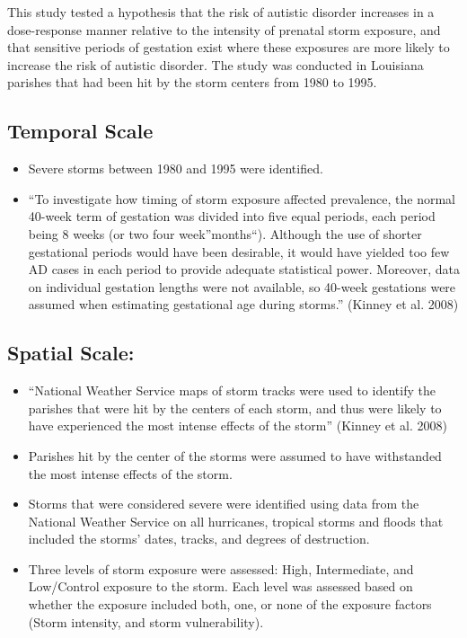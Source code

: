\documentclass[
]{article}
\providecommand{\tightlist}{%
  \setlength{\itemsep}{0pt}\setlength{\parskip}{0pt}}
\begin{document}
This study tested a hypothesis that the risk of autistic disorder
increases in a dose-response manner relative to the intensity of
prenatal storm exposure, and that sensitive periods of gestation exist
where these exposures are more likely to increase the risk of autistic
disorder. The study was conducted in Louisiana parishes that had been
hit by the storm centers from 1980 to 1995.

\hypertarget{temporal-scale}{%
\subsection{Temporal Scale}\label{temporal-scale}}

\begin{itemize}
\tightlist
\item
  Severe storms between 1980 and 1995 were identified.
\item
  ``To investigate how timing of storm exposure affected prevalence, the
  normal 40-week term of gestation was divided into five equal periods,
  each period being 8 weeks (or two four week''months``). Although the
  use of shorter gestational periods would have been desirable, it would
  have yielded too few AD cases in each period to provide adequate
  statistical power. Moreover, data on individual gestation lengths were
  not available, so 40-week gestations were assumed when estimating
  gestational age during storms.'' (Kinney et al. 2008)
\end{itemize}

\hypertarget{spatial-scale}{%
\subsection{Spatial Scale:}\label{spatial-scale}}

\begin{itemize}
\tightlist
\item
  ``National Weather Service maps of storm tracks were used to identify
  the parishes that were hit by the centers of each storm, and thus were
  likely to have experienced the most intense effects of the storm''
  (Kinney et al. 2008)
\item
  Parishes hit by the center of the storms were assumed to have
  withstanded the most intense effects of the storm.
\item
  Storms that were considered severe were identified using data from the
  National Weather Service on all hurricanes, tropical storms and floods
  that included the storms' dates, tracks, and degrees of destruction.
\item
  Three levels of storm exposure were assessed: High, Intermediate, and
  Low/Control exposure to the storm. Each level was assessed based on
  whether the exposure included both, one, or none of the exposure
  factors (Storm intensity, and storm vulnerability).
\end{itemize}
\end{document}
